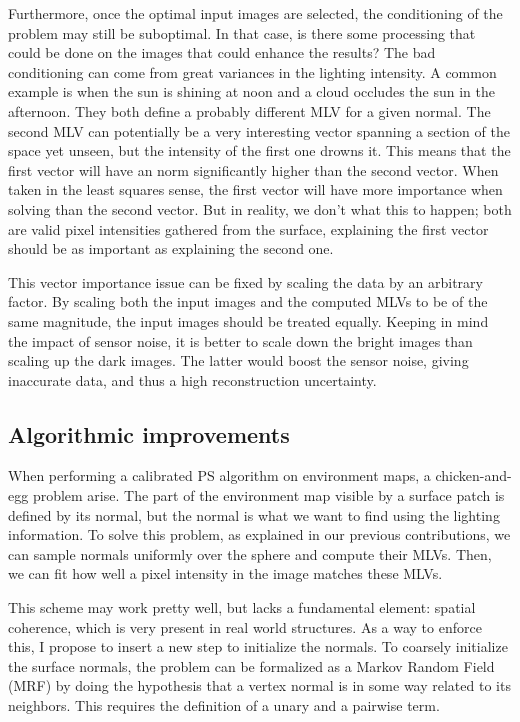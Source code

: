 Furthermore, once the optimal input images are selected, the conditioning of the problem may still be suboptimal. In that case, is there some processing that could be done on the images that could enhance the results? The bad conditioning can come from great variances in the lighting intensity. A common example is when the sun is shining at noon and a cloud occludes the sun in the afternoon. They both define a probably different MLV for a given normal. The second MLV can potentially be a very interesting vector spanning a section of the space yet unseen, but the intensity of the first one drowns it. This means that the first vector will have an norm significantly higher than the second vector. When taken in the least squares sense, the first vector will have more importance when solving than the second vector. But in reality, we don't what this to happen; both are valid pixel intensities gathered from the surface, explaining the first vector should be as important as explaining the second one.

This vector importance issue can be fixed by scaling the data by an arbitrary factor. By scaling both the input images and the computed MLVs to be of the same magnitude, the input images should be treated equally. Keeping in mind the impact of sensor noise, it is better to scale down the bright images than scaling up the dark images. The latter would boost the sensor noise, giving inaccurate data, and thus a high reconstruction uncertainty.




\subsection{Algorithmic improvements}

When performing a calibrated PS algorithm on environment maps, a chicken-and-egg problem arise. The part of the environment map visible by a surface patch is defined by its normal, but the normal is what we want to find using the lighting information. To solve this problem, as explained in our previous contributions, we can sample normals uniformly over the sphere and compute their MLVs. Then, we can fit how well a pixel intensity in the image matches these MLVs.

This scheme may work pretty well, but lacks a fundamental element: spatial coherence, which is very present in real world structures. As a way to enforce this, I propose to insert a new step to initialize the normals. To coarsely initialize the surface normals, the problem can be formalized as a Markov Random Field (MRF) by doing the hypothesis that a vertex normal is in some way related to its neighbors. This requires the definition of a unary and a pairwise term.

